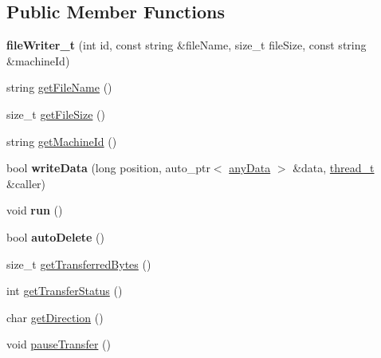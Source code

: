 \subsection*{\-Public \-Member \-Functions}
\begin{DoxyCompactItemize}
\item 
\hypertarget{classfileWriter__t_ae68c0eaeb274b537d9025874a156e161}{{\bfseries file\-Writer\-\_\-t} (int id, const string \&file\-Name, size\-\_\-t file\-Size, const string \&machine\-Id)}\label{classfileWriter__t_ae68c0eaeb274b537d9025874a156e161}

\item 
string \hyperlink{classfileWriter__t_a6e8580403cffb11f8fbae166120d4024}{get\-File\-Name} ()
\item 
size\-\_\-t \hyperlink{classfileWriter__t_a09cc5b7982c3ab50f9c4eab808477c9d}{get\-File\-Size} ()
\item 
string \hyperlink{classfileWriter__t_af18ff82e245cab0d97a1a09a7cf8b500}{get\-Machine\-Id} ()
\item 
\hypertarget{classfileWriter__t_ae5734df5f07c686733cf37b95fbdcb08}{bool {\bfseries write\-Data} (long position, auto\-\_\-ptr$<$ \hyperlink{structanyData}{any\-Data} $>$ \&data, \hyperlink{classthread__t}{thread\-\_\-t} \&caller)}\label{classfileWriter__t_ae5734df5f07c686733cf37b95fbdcb08}

\item 
\hypertarget{classfileWriter__t_a5473a9595c6ae4b50c6a317cb053c864}{void {\bfseries run} ()}\label{classfileWriter__t_a5473a9595c6ae4b50c6a317cb053c864}

\item 
\hypertarget{classfileWriter__t_a1859ec7df424f3b125833f02a85ab3c3}{bool {\bfseries auto\-Delete} ()}\label{classfileWriter__t_a1859ec7df424f3b125833f02a85ab3c3}

\item 
size\-\_\-t \hyperlink{classfileWriter__t_a87945f7fc5338deb6c7c0d885e9c721c}{get\-Transferred\-Bytes} ()
\item 
int \hyperlink{classfileWriter__t_a4a43f1a19bc87050178c619384676c78}{get\-Transfer\-Status} ()
\item 
char \hyperlink{classfileWriter__t_af7b2f70cfe964ae5df8e07cd77e74f3e}{get\-Direction} ()
\item 
\hypertarget{classfileWriter__t_aa3e4622fd057a15cac60617dbfc1339e}{void \hyperlink{classfileWriter__t_aa3e4622fd057a15cac60617dbfc1339e}{pause\-Transfer} ()}\label{classfileWriter__t_aa3e4622fd057a15cac60617dbfc1339e}


\end{DoxyCompactItemize}
